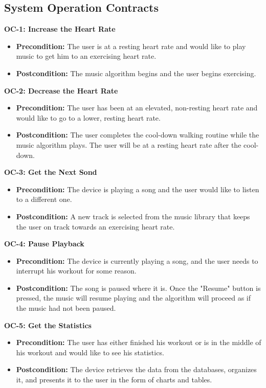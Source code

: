 \documentclass[letterpaper,english, 12pt]{scrreprt}
\begin{document}
\subsection{System Operation Contracts}
{\bf OC-1: Increase the Heart Rate}
\begin{itemize}
	\item {\bf Precondition: } The user is at a resting heart rate and would like to play music to get him to an exercising heart rate.
	\item {\bf Postcondition:} The music algorithm begins and the user begins exercising.
\end{itemize}

{\bf OC-2: Decrease the Heart Rate}
\begin{itemize}
	\item {\bf Precondition: } The user has been at an elevated, non-resting heart rate and would like to go to a lower, resting heart rate.
	\item {\bf Postcondition: } The user completes the cool-down walking routine while the music algorithm plays. The user will be at a resting heart rate after the cool-down.
\end{itemize}

{\bf OC-3: Get the Next Sond}
\begin{itemize}
	\item {\bf Precondition: } The device is playing a song and the user would like to listen to a different one.
	\item {\bf Postcondition: } A new track is selected from the music library that keeps the user on track towards an exercising heart rate.
\end{itemize}

{\bf OC-4: Pause Playback}
\begin{itemize}
	\item {\bf Precondition: } The device is currently playing a song, and the user needs to interrupt his workout for some reason.
	\item {\bf Postcondition: } The song is paused where it is. Once the "Resume" button is pressed, the music will resume playing and the algorithm will proceed as if the music had not been paused.

\end{itemize}

{\bf OC-5: Get the Statistics}
\begin{itemize}
	\item {\bf Precondition: } The user has either finished his workout or is in the middle of his workout and would like to see his statistics.
	\item {\bf Postcondition: } The device retrieves the data from the databases, organizes it, and presents it to the user in the form of charts and tables.
\end{itemize}
\end{document}
